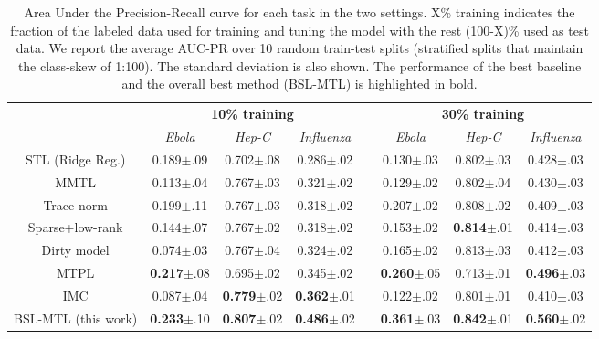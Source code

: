 \documentclass[runningheads,a4paper]{llncs}
\begin{document}
\begin{table*}[t]\caption{Area Under the Precision-Recall curve for each task in the two settings. X\% training indicates the fraction of the labeled data used for training and tuning the model with the rest (100-X)\% used as test data. We report the average AUC-PR over 10 random train-test splits (stratified splits that maintain the class-skew of 1:100). The standard deviation is also shown. The performance of the best baseline and the overall best method (BSL-MTL) is highlighted in bold.}
\label{resultsTable}
\begin{small}
\begin{center}
\def\arraystretch{1.2}
\begin{tabular}{c|ccccccc}
\toprule
& \multicolumn{3}{c}{\textbf{10\% training}} && \multicolumn{3}{c}{\textbf{30\% training}} \\ \cline{2-4}\cline{6-8}
& \textit{Ebola} & \textit{Hep-C} & \textit{Influenza} && \textit{Ebola} & \textit{Hep-C} & \textit{Influenza} \\ \midrule
STL (Ridge Reg.)  & 0.189$\pm$.09 & 0.702$\pm$.08 & 0.286$\pm$.02 && 0.130$\pm$.03 & 0.802$\pm$.03 & 0.428$\pm$.03 \\ 
MMTL \citep{pontil04} & 0.113$\pm$.04 & 0.767$\pm$.03 & 0.321$\pm$.02 && 0.129$\pm$.02 & 0.802$\pm$.04 & 0.430$\pm$.03  \\ 
Trace-norm  & 0.199$\pm$.11 & 0.767$\pm$.03 & 0.318$\pm$.02 && 0.207$\pm$.02 & 0.808$\pm$.02 & 0.409$\pm$.03 \\ 
Sparse+low-rank \citep{chen2012} & 0.144$\pm$.07 & 0.767$\pm$.02 & 0.318$\pm$.02 && 0.153$\pm$.02 & \textbf{0.814}$\pm$.01 & 0.414$\pm$.03  \\ 
Dirty model \citep{jalali2010} & 0.074$\pm$.03 & 0.767$\pm$.04 & 0.324$\pm$.02 && 0.165$\pm$.02 & 0.813$\pm$.03 & 0.412$\pm$.03  \\ 
MTPL \citep{me_ismb_2013} & \textbf{0.217}$\pm$.08 & 0.695$\pm$.02 & 0.345$\pm$.02 && \textbf{0.260}$\pm$.05 & 0.713$\pm$.01 & \textbf{0.496}$\pm$.03 \\ 
IMC \citep{nagarajan} & 0.087$\pm$.04 & \textbf{0.779}$\pm$.02 & \textbf{0.362}$\pm$.01 && 0.122$\pm$.02 & 0.801$\pm$.01 & 0.410$\pm$.03  \\ \midrule
BSL-MTL (this work) & \textbf{0.233}$\pm$.10 & \textbf{0.807}$\pm$.02 & \textbf{0.486}$\pm$.02 && \textbf{0.361}$\pm$.03 & \textbf{0.842}$\pm$.01 & \textbf{0.560}$\pm$.02  \\ \bottomrule
\end{tabular}
\end{center}
\end{small}
\end{table*}
\end{document}
